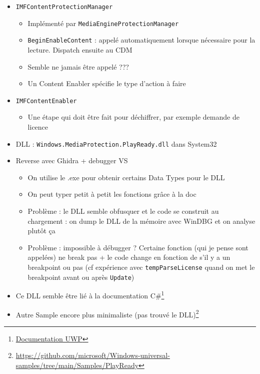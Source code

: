 \documentclass[french]{article}
\begin{document}
\begin{itemize}
	
 	\item \texttt{IMFContentProtectionManager}
	\begin{itemize}
		\item Implémenté par \texttt{MediaEngineProtectionManager}
		\item \texttt{BeginEnableContent} : appelé automatiquement lorsque nécessaire pour la lecture. Dispatch ensuite au CDM
		\item Semble ne jamais être appelé ???
		\item Un Content Enabler spécifie le type d'action à faire
	\end{itemize}
	
	\item \texttt{IMFContentEnabler}
	\begin{itemize}
		\item Une étape qui doit être fait pour déchiffrer, par exemple demande de licence
	\end{itemize}
	
	\item DLL : \texttt{Windows.MediaProtection.PlayReady.dll} dans System32
	\item Reverse avec Ghidra + debugger VS
		\begin{itemize}
			\item On utilise le .exe pour obtenir certains Data Types pour le DLL
			\item On peut typer petit à petit les fonctions grâce à la doc
			\item Problème : le DLL semble obfusquer et le code se construit au chargement : on dump le DLL de la mémoire avec WinDBG et on analyse plutôt ça
			\item Problème : impossible à débugger ? Certaine fonction (qui je pense sont appelées) ne break pas + le code change en fonction de s'il y a un breakpoint ou pas (cf expérience avec \texttt{tempParseLicense} quand on met le breakpoint avant ou après \texttt{Update})
		\end{itemize}
	\item Ce DLL semble être lié à la documentation C\#\footnote{\href{https://learn.microsoft.com/fr-fr/uwp/api/windows.media.protection.playready}{Documentation UWP}}
	\item Autre Sample encore plus minimaliste (pas trouvé le DLL)\footnote{\href{Universal PlayReady Sample}{https://github.com/microsoft/Windows-universal-samples/tree/main/Samples/PlayReady}}
\end{itemize}
\end{document}
